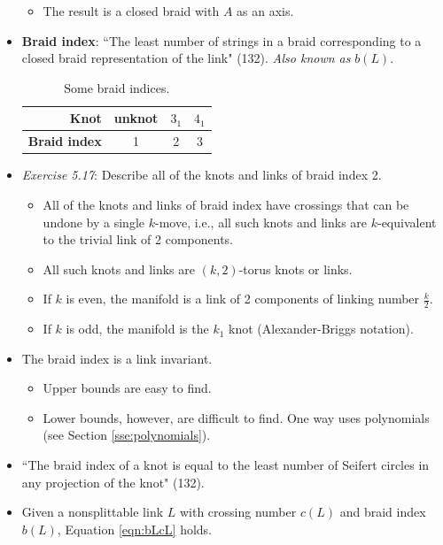 \documentclass[titlepage]{article}
\numberwithin{figure}{section}
\numberwithin{table}{section}
\numberwithin{equation}{section}
\newcommand{\dq}[2]{``#1" (#2).}
\begin{document}
\begin{itemize}
\begin{itemize}
        \item The result is a closed braid with $A$ as an axis.
    \end{itemize}
    \item \textbf{Braid index}: \dq{The least number of strings in a braid corresponding to a closed braid representation of the link}{132} \emph{Also known as} $b(L)$.
    \begin{table}[h!]
        \centering
        \renewcommand{\arraystretch}{1.4}
        \begin{tabular}{|r|c|c|c|}
            \hline
            \textbf{Knot}        & unknot & $3_1$ & $4_1$\\
            \hline
            \textbf{Braid index} & 1      & 2     & 3    \\
            \hline
        \end{tabular}
        \caption{Some braid indices.}
        \label{tab:simpb-L}
    \end{table}
    \item \emph{Exercise 5.17}: Describe all of the knots and links of braid index 2.
    \begin{itemize}
        \item All of the knots and links of braid index have crossings that can be undone by a single $k$-move, i.e., all such knots and links are $k$-equivalent to the trivial link of 2 components.
        \item All such knots and links are $(k,2)$-torus knots or links.
        \item If $k$ is even, the manifold is a link of 2 components of linking number $\frac{k}{2}$.
        \item If $k$ is odd, the manifold is the $k_1$ knot (Alexander-Briggs notation).
    \end{itemize}
    \item The braid index is a link invariant.
    \begin{itemize}
        \item Upper bounds are easy to find.
        \item Lower bounds, however, are difficult to find. One way uses polynomials (see Section \ref{sse:polynomials}).
    \end{itemize}
    \item \dq{The braid index of a knot is equal to the least number of Seifert circles in any projection of the knot}{132}
    \item Given a nonsplittable link $L$ with crossing number $c(L)$ and braid index $b(L)$, Equation \ref{eqn:bLcL} holds.

\end{itemize}
\end{document}
